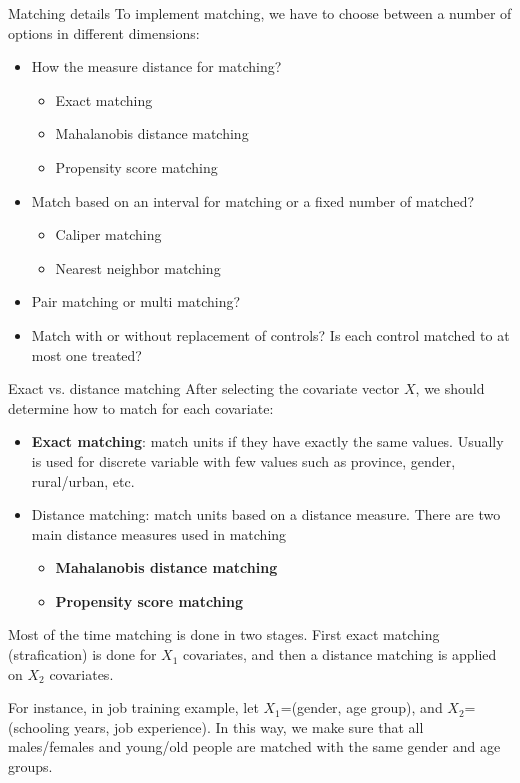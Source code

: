 \documentclass[handout]{beamer}
\begin{document}
\begin{frame}{Matching details}
	To implement matching, we have to choose between a number of options in different dimensions:
	\begin{itemize}
		\item How the measure distance for matching?
		\begin{itemize}
			\item Exact matching
			\item Mahalanobis distance matching
			\item Propensity score matching
		\end{itemize}
		\item Match based on an interval for matching or a fixed number of matched?
		\begin{itemize}
			\item Caliper matching
			\item Nearest neighbor matching
		\end{itemize}
		\item Pair matching or multi matching?
		\item Match with or without replacement of controls? Is each control matched to at most one treated?
	\end{itemize}
\end{frame}

\begin{frame}{Exact vs. distance matching}
	After selecting the covariate vector $X$, we should determine how to match for each covariate:
	\begin{itemize}
		\item \textbf{Exact matching}: match units if they have exactly the same values. Usually is used for discrete variable with few values such as province, gender, rural/urban, etc.
		\item Distance matching: match units based on a distance measure. There are two main distance measures used in matching
		\begin{itemize}
			\item \textbf{Mahalanobis distance matching}
			\item \textbf{Propensity score matching}
		\end{itemize}
	\end{itemize}\medskip

Most of the time matching is done in two stages. First exact matching (strafication) is done for $X_1$ covariates, and then a distance matching is applied on $X_2$ covariates.\medskip

For instance, in job training example, let $X_1$=(gender, age group), and $X_2$=(schooling years, job experience). In this way, we make sure that all males/females and young/old people are matched with the same gender and age groups.
\end{frame}
\end{document}
